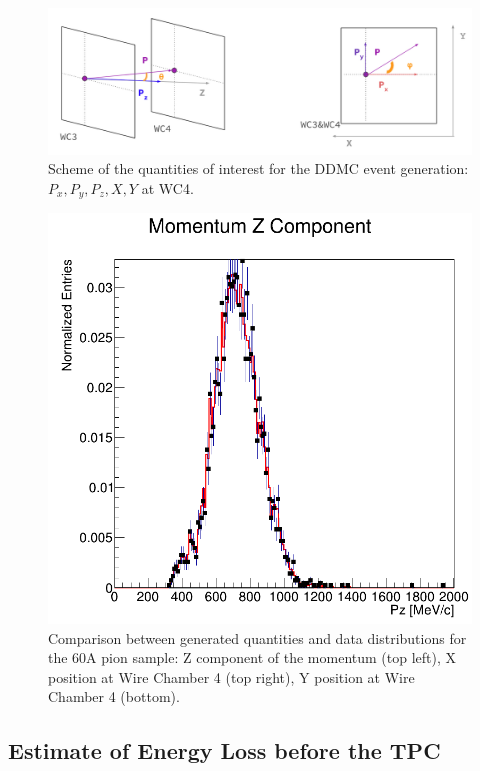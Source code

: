 \begin{figure}[hpbt]
\centering
\includegraphics[width=\textwidth]{Chapter-5/Images/DDMCQuantities.png}
\caption{Scheme of the quantities of interest for the DDMC event generation: $P_x, P_y, P_z, X, Y$ at WC4.}
\label{fig:DDMCQuantities}
\end{figure}


\begin{figure}[hpbt]
\centering
\includegraphics[width=\textwidth]{Chapter-5/Images/Pz.png}
\caption{Comparison between generated quantities and data distributions for the 60A pion sample: Z component of the momentum (top left), X position at Wire Chamber 4 (top right), Y position at Wire Chamber 4 (bottom).}
\label{fig:DDMCComparison}
\end{figure}



\subsection{Estimate of Energy Loss before the TPC}\label{ch:eloss}


